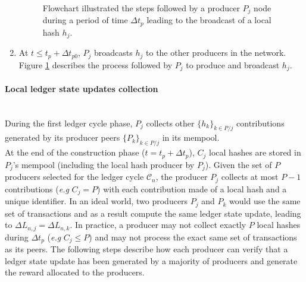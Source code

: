 \begin{enumerate}
\begin{figure}[H]
\label{fig:LLSU}
\caption{\label{fig:LLSU} Flowchart illustrated the steps followed by a producer $P_j$ node during a period of time $\Delta t_{p}$ leading to the broadcast of a local hash $h_j$.}
\end{figure}
\item At $t \leq t_p + \Delta t_{p0}$, $P_j$ broadcasts $h_j$ to the other producers in the network. Figure \ref{fig:LLSU} describes the process followed by $P_j$ to produce and broadcast $h_j$.  
\end{enumerate}

\paragraph{Local ledger state updates collection}\mbox{}\\

During the first ledger cycle phase, $P_j$ collects other $\{h_k\}_{k \in P/j}$ contributions generated by its producer peers $\{P_k\}_{k \in P/j}$ in its mempool. \\

At the end of the construction phase ($t = t_p + \Delta t_{p}$), $C_j$ local hashes are stored in $P_j$'s mempool (including the local hash producer by $P_j$). Given the set of $P$ producers selected for the ledger cycle $\mathcal{C}_n$, the producer $P_j$ collects at most $P - 1$ contributions (\textit{e.g} $C_j = P$) with each contribution made of a local hash and a unique identifier. In an ideal world, two producers $P_j$ and $P_k$ would use the same set of transactions and as a result compute the same ledger state update, leading to $\Delta L_{n,j} = \Delta L_{n,k}$. In practice, a producer may not collect exactly $P$ local hashes during $\Delta t_{p}$  (\textit{e.g} $C_j \leq P$) and may not process the exact same set of transactions as its peers. The following steps describe how each producer can verify that a ledger state update has been generated by a majority of producers and generate the reward allocated to the producers. 

